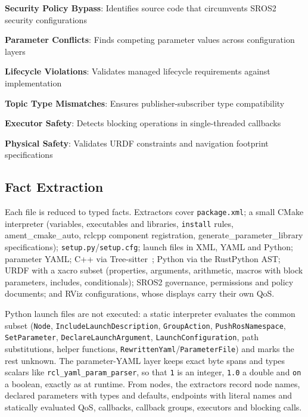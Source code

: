 \documentclass[conference]{IEEEtran}
\newcommand{\code}[1]{\texttt{#1}}
\begin{document}
\textbf{Security Policy Bypass}: Identifies source code that circumvents SROS2 security
configurations

\textbf{Parameter Conflicts}: Finds competing parameter values across configuration layers

\textbf{Lifecycle Violations}: Validates managed lifecycle requirements against implementation

\textbf{Topic Type Mismatches}: Ensures publisher-subscriber type compatibility

\textbf{Executor Safety}: Detects blocking operations in single-threaded callbacks

\textbf{Physical Safety}: Validates URDF constraints and navigation footprint specifications


\subsection{Fact Extraction}
\label{sec:facts}

Each file is reduced to typed facts. Extractors cover \code{package.xml}; a small CMake
interpreter (variables, executables and libraries, \code{install} rules, ament\_cmake\_auto,
rclcpp component registration, generate\_parameter\_library specifications);
\code{setup.py}/\code{setup.cfg}; launch files in XML, YAML and Python; parameter YAML; C++
via Tree-sitter~\cite{treesitter}; Python via the RustPython AST; URDF with a xacro subset
(properties, arguments, arithmetic, macros with block parameters, includes, conditionals); SROS2
governance, permissions and policy documents; and RViz configurations, whose displays carry
their own QoS.

Python launch files are not executed: a static interpreter evaluates the common subset
(\code{Node}, \code{IncludeLaunchDescription}, \code{GroupAction}, \code{PushRosNamespace},
\code{SetParameter}, \code{DeclareLaunchArgument}, \code{LaunchConfiguration}, path
substitutions, helper functions, \code{RewrittenYaml}/\code{ParameterFile}) and marks the rest
unknown. The parameter-YAML layer keeps exact byte spans and types scalars like
\code{rcl\_yaml\_param\_parser}, so that \code{1} is an integer, \code{1.0} a double and
\code{on} a boolean, exactly as at runtime. From nodes, the extractors record node names,
declared parameters with types and defaults, endpoints with literal names and statically
evaluated QoS, callbacks, callback groups, executors and blocking calls.
\end{document}
